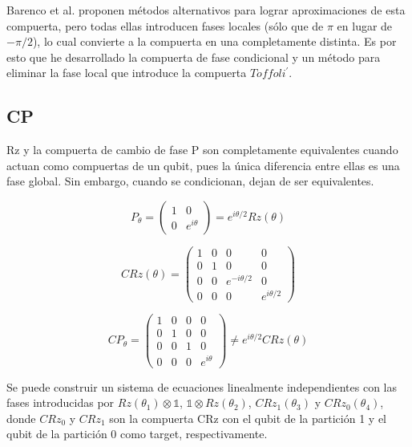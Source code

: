 Barenco et al. proponen métodos alternativos para lograr aproximaciones de esta compuerta, pero todas ellas introducen fases locales (sólo que de $\pi$ en lugar de $-\pi/2$), lo cual convierte a la compuerta en una completamente distinta. Es por esto que he desarrollado la compuerta de fase condicional y un método para eliminar la fase local que introduce la compuerta $Toffoli^\prime$.

\subsection{CP}

Rz y la compuerta de cambio de fase P son completamente equivalentes cuando actuan como compuertas de un qubit, pues la única diferencia entre ellas es una fase global. Sin embargo, cuando se condicionan, dejan de ser equivalentes.

\begin{equation}
    P_\theta = 
    \begin{pmatrix}
        1 & 0 \\
        0 & e^{i \theta}
    \end{pmatrix} = 
    e^{i \theta/2} Rz(\theta)
\end{equation}

\begin{equation}
    CRz(\theta) = 
    \begin{pmatrix}
        1 & 0 & 0 & 0 \\
        0 & 1 & 0 & 0 \\
        0 & 0 & e^{-i \theta/2} & 0 \\
        0 & 0 & 0 & e^{i \theta/2}
    \end{pmatrix}
\end{equation}

\begin{equation}
    CP_\theta = 
    \begin{pmatrix}
        1 & 0 & 0 & 0 \\
        0 & 1 & 0 & 0 \\
        0 & 0 & 1 & 0 \\
        0 & 0 & 0 & e^{i \theta}
    \end{pmatrix} \neq
    e^{i \theta/2} CRz(\theta)
\end{equation}

Se puede construir un sistema de ecuaciones linealmente independientes con las fases introducidas por $Rz(\theta_1) \otimes \mathds{1}$, $\mathds{1} \otimes Rz(\theta_2)$, $CRz_1(\theta_3)$ y $CRz_0(\theta_4)$, donde $CRz_0$ y $CRz_1$ son la compuerta CRz con el qubit de la partición 1 y el qubit de la partición 0 como target, respectivamente.

